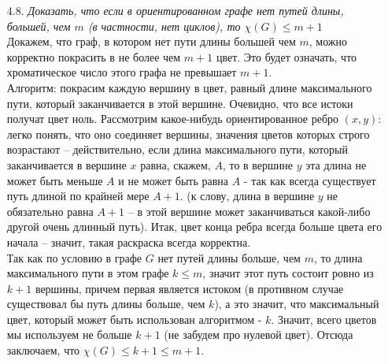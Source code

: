 \documentclass[10pt,a4paper]{article}
\begin{document}
\begin{enumerate}
	\item[4.8.] \textit{Доказать, что если в ориентированном графе нет путей длины, большей, чем $m$ (в частности, нет циклов), то $\chi(G) \leqslant m+1$}\\
	Докажем, что граф, в котором нет пути длины большей чем $m$, можно корректно покрасить в не более чем $m+1$ цвет. Это будет означать, что хроматическое число этого графа не превышает $m+1$.\\
	Алгоритм: покрасим каждую вершину в цвет, равный длине максимального пути, который заканчивается в этой вершине. Очевидно, что все истоки получат цвет ноль. Рассмотрим какое-нибудь ориентированное ребро $(x, y)$: легко понять, что оно соединяет вершины, значения цветов которых строго возрастают -- действительно, если длина максимального пути, который заканчивается в вершине $x$ равна, скажем, $A$, то в вершине $y$ эта длина не может быть меньше $A$ и не может быть равна $A$ - так как всегда существует путь длиной по крайней мере $A+1$. (к слову, длина в вершине $y$ не обязательно равна $A+1$ -- в этой вершине может заканчиваться какой-либо другой очень длинный путь). Итак, цвет конца ребра всегда больше цвета его начала -- значит, такая раскраска всегда корректна. \\
	Так как по условию в графе $G$ нет путей длины больше, чем $m$, то длина максимального пути в этом графе $k \leqslant m$, значит этот путь состоит ровно из $k+1$ вершины, причем первая является истоком (в противном случае существовал бы путь длины больше, чем $k$), а это значит, что максимальный цвет, который может быть использован алгоритмом - $k$. Значит, всего цветов мы используем не больше $k+1$ (не забудем про нулевой цвет). Отсюда заключаем, что $\chi(G) \leqslant k+1 \leqslant m+1$.
	

\end{enumerate}
\end{document}
